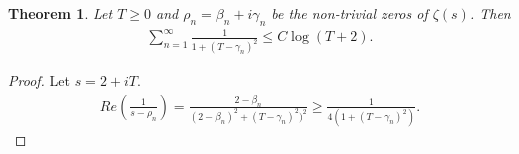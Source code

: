 \documentclass[a4paper,10pt]{amsart}
\newtheorem{theorem}{Theorem}[section]
\begin{document}
\begin{theorem}
   Let $T \geq 0$ and $\rho_n = \beta_n + i \gamma_n$ be the non-trivial 
   zeros of $\zeta(s)$. Then
   \begin{align*}
       \sum^{\infty}_{n=1} \frac{1}{1 + (T-\gamma_n)^2} \leq C \log(T+2). 
   \end{align*}
\end{theorem}

\begin{proof}
    Let $s = 2 + iT$.
    \begin{align*}
        Re(\frac{1}{s - \rho_n}) = 
        \frac{2 - \beta_n}{(2-\beta_n)^{2} + (T-\gamma_n)^{2})^2} 
        \geq \frac{1}{4(1+(T-\gamma_n)^2)}.
   \end{align*} 
\end{proof}
\end{document}
